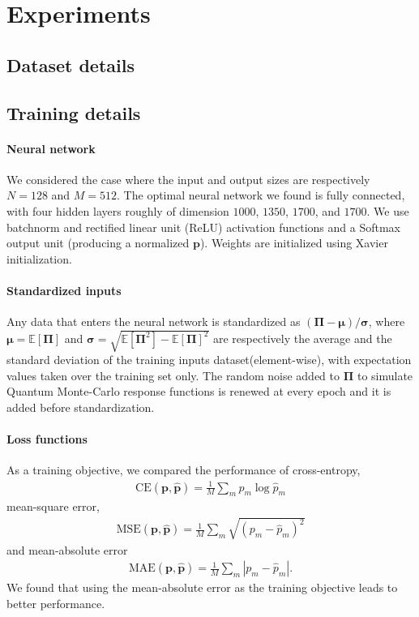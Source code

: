 \documentclass[notitlepage, 11pt, nofootinbib]{revtex4-1}
\renewcommand{\vec}[1]{\bm{#1}}
\begin{document}
\begin{figure}
    \caption{}
    \label{fig_prep_compare}
\end{figure}

\section{Experiments}

\subsection{Dataset details}


\subsection{Training details}
\label{sec_training}


\paragraph*{Neural network} We considered the case where the input and output sizes are respectively $N=128$ and $M=512$. The optimal neural network we found is fully connected, with four hidden layers roughly of dimension $1000$, $1350$, $1700$, and $1700$. We use batchnorm and rectified linear unit (ReLU) activation functions and a Softmax output unit (producing a normalized $\vec p$). Weights are initialized using Xavier initialization.

\paragraph*{Standardized inputs} Any data that enters the neural network is standardized as $(\vec \Pi - \vec\mu)/\vec\sigma$, where $\vec \mu = \mathbb{E}[\vec \Pi]$ and $\vec \sigma = \sqrt{\mathbb{E}[\vec \Pi^2] - \mathbb{E}[\vec \Pi]^2}$ are respectively the average and the standard deviation of the training inputs dataset(element-wise), with expectation values taken over the training set only. The random noise added to $\vec \Pi$ to simulate Quantum Monte-Carlo response functions is renewed at every epoch and it is added before standardization.

\paragraph*{Loss functions} As a training objective, we compared the performance of cross-entropy, 
\begin{align}
    \text{CE}(\vec p,\hat{\vec p}) = \frac{1}{M}\sum_m p_m \log \hat{p}_m
\end{align}
mean-square error, 
\begin{align}
    \text{MSE}(\vec p,\hat{\vec p}) = \frac{1}{M}\sum_m \sqrt{(p_m - \hat{p}_m)^2}
\end{align}
and mean-absolute error
\begin{align}
    \text{MAE}(\vec p,\hat{\vec p}) = \frac{1}{M}\sum_m |p_m - \hat{p}_m|.
\end{align}
We found that using the mean-absolute error as the training objective leads to better performance.
\end{document}
